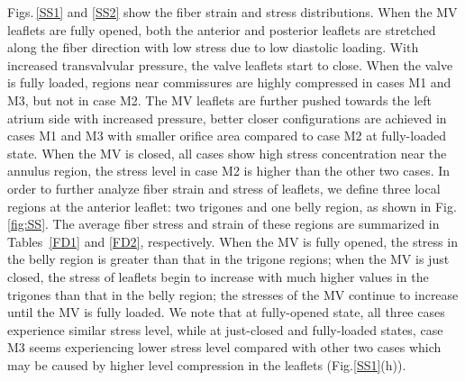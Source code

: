 \documentclass[fleqn,10pt]{wlscirep}
\begin{document}
Figs.\,\ref{SS1} and \ref{SS2} show the fiber strain and  stress distributions. When the MV leaflets are fully opened, both the anterior and posterior leaflets are stretched along the fiber direction with low stress due to low diastolic loading. With increased transvalvular pressure, the valve leaflets start to  close. When the valve is fully loaded,  regions near commissures  are highly compressed in cases M1 and M3, but not in case M2. The MV leaflets are further pushed towards the left atrium side with increased pressure, better closer configurations are achieved in cases M1 and M3 with smaller orifice area compared to case M2 at fully-loaded state. When the MV is closed, all cases show high stress concentration near the annulus region, the stress level in case M2 is higher than the other two cases. In order to further analyze fiber strain and stress of leaflets, we define three local regions at the anterior leaflet: two trigones and one belly region, as shown in Fig.\,\ref{fig:SS}. The average fiber stress and strain of these regions are summarized in Tables~\ref{FD1} and \ref{FD2}, respectively. When the MV is fully opened, the stress in the belly region is greater than that in the trigone regions; when the MV is just closed, the stress of leaflets begin to increase with much higher values  in the trigones than that in the belly region; the stresses of the MV continue to increase until the MV is fully loaded. We note that at fully-opened state, all three cases experience similar stress level, while at just-closed and fully-loaded states, case M3 seems experiencing lower stress level compared with other two cases which may be caused by higher level compression in the leaflets (Fig.\ref{SS1}(h)). 
 

\end{document}
